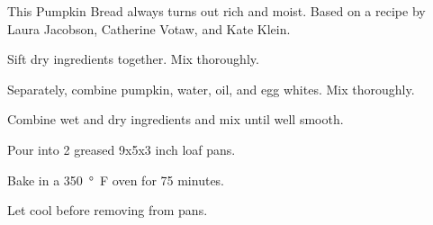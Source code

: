 

This Pumpkin Bread always turns out rich and moist. Based on a recipe by Laura Jacobson, Catherine Votaw, and Kate Klein.


Sift dry ingredients together. Mix thoroughly.

\begin{ingredients}
\end{ingredients}

Separately, combine pumpkin, water, oil, and egg whites. Mix thoroughly.

\begin{ingredients}
\end{ingredients}

Combine wet and dry ingredients and mix until well smooth.

Pour into 2 greased 9x5x3 inch loaf pans.

Bake in a \SI{350}{°F} oven for 75 minutes.

Let cool before removing from pans.
